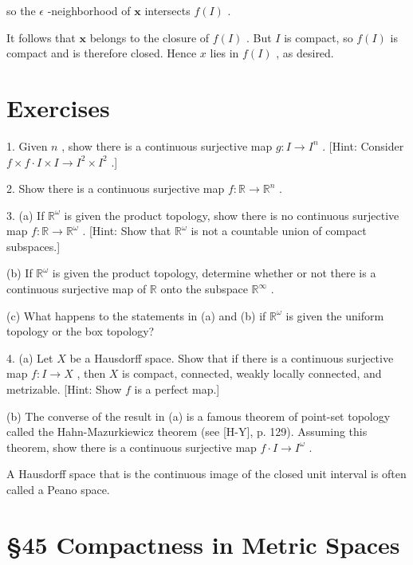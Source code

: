 \documentclass[10pt]{article}
\begin{document}
so the \(\epsilon\) -neighborhood of \(\mathbf{x}\) intersects \(f\left( I\right)\) .

It follows that \(\mathbf{x}\) belongs to the closure of \(f\left( I\right)\) . But \(I\) is compact, so \(f\left( I\right)\) is compact and is therefore closed. Hence \(x\) lies in \(f\left( I\right)\) , as desired.

\section*{Exercises}

1. Given \(n\) , show there is a continuous surjective map \(g : I \rightarrow  {I}^{n}\) . [Hint: Consider \(f \times  f \cdot  I \times  I \rightarrow  {I}^{2} \times  {I}^{2}\) .]

2. Show there is a continuous surjective map \(f : \mathbb{R} \rightarrow  {\mathbb{R}}^{n}\) .

3. (a) If \({\mathbb{R}}^{\omega }\) is given the product topology, show there is no continuous surjective map \(f : \mathbb{R} \rightarrow  {\mathbb{R}}^{\omega }\) . [Hint: Show that \({\mathbb{R}}^{\omega }\) is not a countable union of compact subspaces.]

(b) If \({\mathbb{R}}^{\omega }\) is given the product topology, determine whether or not there is a continuous surjective map of \(\mathbb{R}\) onto the subspace \({\mathbb{R}}^{\infty }\) .

(c) What happens to the statements in (a) and (b) if \({\mathbb{R}}^{\omega }\) is given the uniform topology or the box topology?

4. (a) Let \(X\) be a Hausdorff space. Show that if there is a continuous surjective map \(f : I \rightarrow  X\) , then \(X\) is compact, connected, weakly locally connected, and metrizable. [Hint: Show \(f\) is a perfect map.]

(b) The converse of the result in (a) is a famous theorem of point-set topology called the Hahn-Mazurkiewicz theorem (see [H-Y], p. 129). Assuming this theorem, show there is a continuous surjective map \(f \cdot  I \rightarrow  {I}^{\omega }\) .

A Hausdorff space that is the continuous image of the closed unit interval is often called a Peano space.

\section*{§45 Compactness in Metric Spaces}
\end{document}
